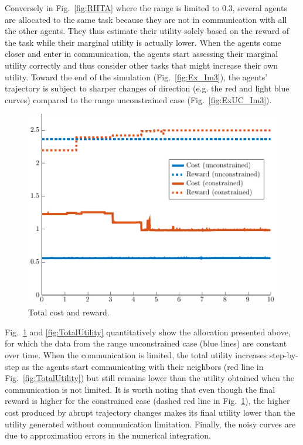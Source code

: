 \documentclass{ifacconf}
\begin{document}
Conversely in Fig.~\ref{fig:RHTA} where the range is limited to 0.3, several agents are allocated to the same task because they are not in communication with all the other agents. They thus estimate their utility solely based on the reward of the task while their marginal utility is actually lower. When the agents come closer and enter in communication, the agents start assessing their marginal utility correctly and thus consider other tasks that might increase their own utility. Toward the end of the simulation (Fig.~\ref{fig:Ex_Im3}), the agents' trajectory is subject to sharper changes of direction (e.g. the red and light blue curves) compared to the range unconstrained case (Fig.~\ref{fig:ExUC_Im3}).

\begin{figure}[h]
  \centering
  \includegraphics[width=0.8\linewidth]{Figures/CostReward.pdf}
  \caption{Total cost and reward.}
  \label{fig:CostReward}
\end{figure}

Fig.~\ref{fig:CostReward} and \ref{fig:TotalUtility} quantitatively show the allocation presented above, for which the data from the range unconstrained case (blue lines) are constant over time. When the communication is limited, the total utility increases step-by-step as the agents start communicating with their neighbors (red line in Fig.~\ref{fig:TotalUtility}) but still remains lower than the utility obtained when the communication is not limited. It is worth noting that even though the final reward is higher for the constrained case (dashed red line in Fig.~\ref{fig:CostReward}), the higher cost produced by abrupt trajectory changes makes its final utility lower than the utility generated without communication limitation. Finally, the noisy curves are due to approximation errors in the numerical integration.
\end{document}

